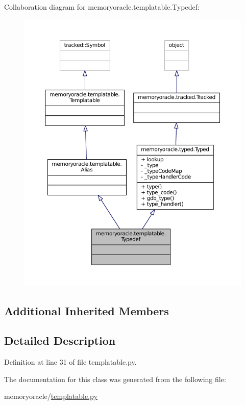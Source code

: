 Collaboration diagram for memoryoracle.\+templatable.\+Typedef\+:\nopagebreak
\begin{figure}[H]
\begin{center}
\leavevmode
\includegraphics[width=350pt]{classmemoryoracle_1_1templatable_1_1Typedef__coll__graph}
\end{center}
\end{figure}
\subsection*{Additional Inherited Members}


\subsection{Detailed Description}


Definition at line 31 of file templatable.\+py.



The documentation for this class was generated from the following file\+:\begin{DoxyCompactItemize}
\item 
memoryoracle/\hyperlink{templatable_8py}{templatable.\+py}\end{DoxyCompactItemize}
